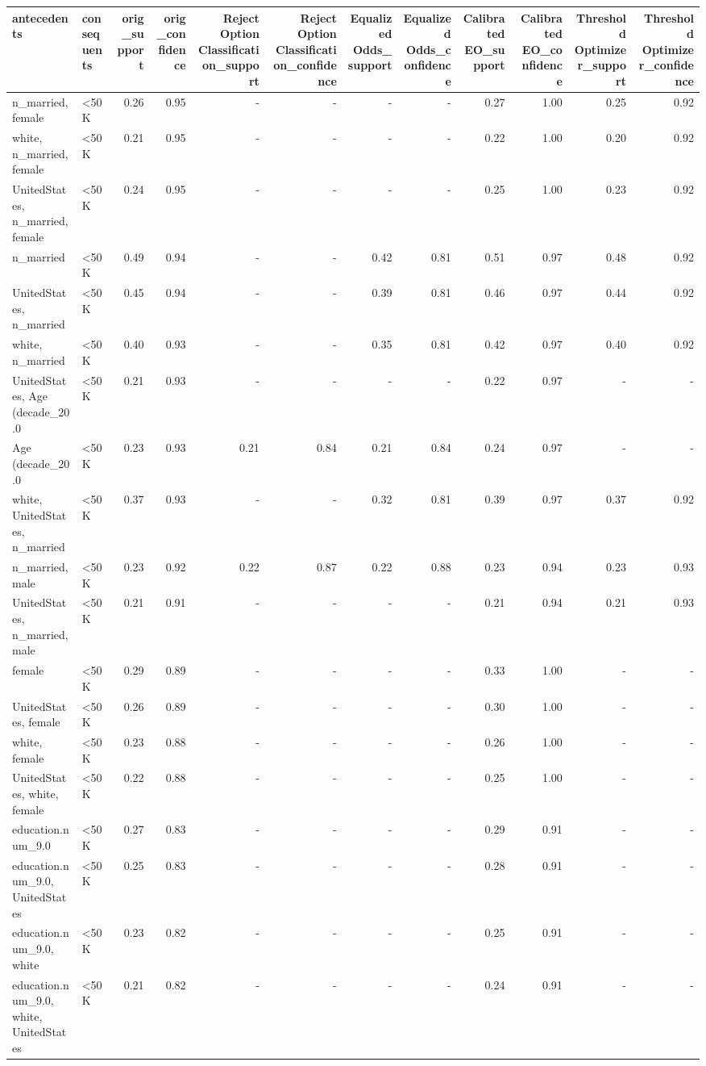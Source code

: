 \begin{tabular}{llrrrrrrrrrr}
\toprule
antecedents & consequents & orig\_support & orig\_confidence & Reject Option Classification\_support & Reject Option Classification\_confidence & Equalized Odds\_support & Equalized Odds\_confidence & Calibrated EO\_support & Calibrated EO\_confidence & Threshold Optimizer\_support & Threshold Optimizer\_confidence \\
\midrule
n\_married, female & <50K & 0.26 & 0.95 & - & - & - & - & 0.27 & 1.00 & 0.25 & 0.92 \\
white, n\_married, female & <50K & 0.21 & 0.95 & - & - & - & - & 0.22 & 1.00 & 0.20 & 0.92 \\
UnitedStates, n\_married, female & <50K & 0.24 & 0.95 & - & - & - & - & 0.25 & 1.00 & 0.23 & 0.92 \\
n\_married & <50K & 0.49 & 0.94 & - & - & 0.42 & 0.81 & 0.51 & 0.97 & 0.48 & 0.92 \\
UnitedStates, n\_married & <50K & 0.45 & 0.94 & - & - & 0.39 & 0.81 & 0.46 & 0.97 & 0.44 & 0.92 \\
white, n\_married & <50K & 0.40 & 0.93 & - & - & 0.35 & 0.81 & 0.42 & 0.97 & 0.40 & 0.92 \\
UnitedStates, Age (decade\_20.0 & <50K & 0.21 & 0.93 & - & - & - & - & 0.22 & 0.97 & - & - \\
Age (decade\_20.0 & <50K & 0.23 & 0.93 & 0.21 & 0.84 & 0.21 & 0.84 & 0.24 & 0.97 & - & - \\
white, UnitedStates, n\_married & <50K & 0.37 & 0.93 & - & - & 0.32 & 0.81 & 0.39 & 0.97 & 0.37 & 0.92 \\
n\_married, male & <50K & 0.23 & 0.92 & 0.22 & 0.87 & 0.22 & 0.88 & 0.23 & 0.94 & 0.23 & 0.93 \\
UnitedStates, n\_married, male & <50K & 0.21 & 0.91 & - & - & - & - & 0.21 & 0.94 & 0.21 & 0.93 \\
female & <50K & 0.29 & 0.89 & - & - & - & - & 0.33 & 1.00 & - & - \\
UnitedStates, female & <50K & 0.26 & 0.89 & - & - & - & - & 0.30 & 1.00 & - & - \\
white, female & <50K & 0.23 & 0.88 & - & - & - & - & 0.26 & 1.00 & - & - \\
UnitedStates, white, female & <50K & 0.22 & 0.88 & - & - & - & - & 0.25 & 1.00 & - & - \\
education.num\_9.0 & <50K & 0.27 & 0.83 & - & - & - & - & 0.29 & 0.91 & - & - \\
education.num\_9.0, UnitedStates & <50K & 0.25 & 0.83 & - & - & - & - & 0.28 & 0.91 & - & - \\
education.num\_9.0, white & <50K & 0.23 & 0.82 & - & - & - & - & 0.25 & 0.91 & - & - \\
education.num\_9.0, white, UnitedStates & <50K & 0.21 & 0.82 & - & - & - & - & 0.24 & 0.91 & - & - \\
\bottomrule
\end{tabular}
